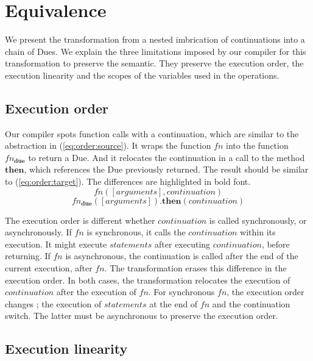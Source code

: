 \section{Equivalence} \label{section:equivalence}

We present the transformation from a nested imbrication of continuations into a chain of Dues.
We explain the three limitations imposed by our compiler for this transformation to preserve the semantic.
They preserve the execution order, the execution linearity and the scopes of the variables used in the operations.

\subsection{Execution order}

Our compiler spots function calls with a continuation, which are similar to the abstraction in (\ref{eq:order:source}).
It wraps the function $fn$ into the function $fn_\textbf{due}$ to return a Due.
And it relocates the continuation in a call to the method $\textbf{then}$, which references the Due previously returned.
The result should be similar to (\ref{eq:order:target}).
The differences are highlighted in bold font.
\begin{equation} \label{eq:order:source}
fn([arguments], continuation)
\end{equation}
\begin{equation} \label{eq:order:target}
fn_\textbf{due}([arguments])\textbf{.then}(continuation)
\end{equation}

The execution order is different whether $continuation$ is called synchronously, or asynchronously.
If $fn$ is synchronous, it calls the $continuation$ within its execution.
It might execute $statements$ after executing $continuation$, before returning.
If $fn$ is asynchronous, the continuation is called after the end of the current execution, after $fn$.
The transformation erases this difference in the execution order.
In both cases, the transformation relocates the execution of $continuation$ after the execution of $fn$.
For synchronous $fn$, the execution order changes ; the execution of $statements$ at the end of $fn$ and the continuation switch.
The latter must be asynchronous to preserve the execution order.

\subsection{Execution linearity}

